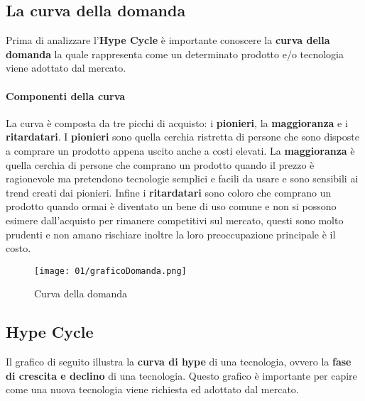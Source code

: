     \subsection{La curva della domanda}
        Prima di analizzare l'\textbf{Hype Cycle} è importante conoscere la \textbf{curva della domanda} la quale rappresenta come un determinato prodotto e/o tecnologia viene adottato dal mercato.
        \paragraph{Componenti della curva} 
            La curva è composta da tre picchi di acquisto: i \textbf{pionieri}, la \textbf{maggioranza} e i \textbf{ritardatari}.\newline 
            I \textbf{pionieri} sono quella cerchia ristretta di persone che sono disposte a comprare un prodotto appena uscito anche a costi elevati. La \textbf{maggioranza} è quella cerchia di persone che comprano un prodotto quando il prezzo è ragionevole ma pretendono tecnologie semplici e facili da usare e sono sensibili ai trend creati dai pionieri. Infine i \textbf{ritardatari} sono coloro che comprano un prodotto quando ormai è diventato un bene di uso comune e non si possono esimere dall'acquisto per rimanere competitivi sul mercato, questi sono molto prudenti e non amano rischiare inoltre la loro preoccupazione principale è il costo.
            \begin{figure}[H]
                \centering
                \texttt{[image: 01/graficoDomanda.png]}
                \caption{Curva della domanda}
            \end{figure}
    
    \subsection{Hype Cycle}
        Il grafico di seguito illustra la \textbf{curva di hype} di una tecnologia, ovvero la \textbf{fase di crescita e declino} di una tecnologia. Questo grafico è importante per capire come una nuova tecnologia viene richiesta ed adottato dal mercato.
